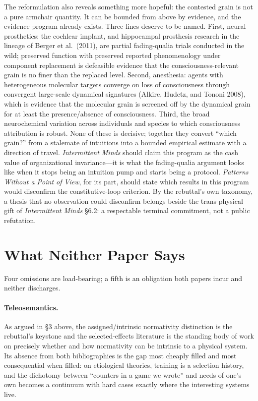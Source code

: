 \documentclass[11pt]{article}
\newcommand{\IM}{\emph{Intermittent Minds}}
\newcommand{\PP}{\emph{Patterns Without a Point of View}}
\begin{document}
The reformulation also reveals something more hopeful: the contested grain is not a pure armchair quantity. It can be bounded from above by evidence, and the evidence program already exists. Three lines deserve to be named. First, neural prosthetics: the cochlear implant, and hippocampal prosthesis research in the lineage of Berger et al.\ (2011), are partial fading-qualia trials conducted in the wild; preserved function with preserved reported phenomenology under component replacement is defeasible evidence that the consciousness-relevant grain is no finer than the replaced level. Second, anesthesia: agents with heterogeneous molecular targets converge on loss of consciousness through convergent large-scale dynamical signatures (Alkire, Hudetz, and Tononi 2008), which is evidence that the molecular grain is screened off by the dynamical grain for at least the presence/absence of consciousness. Third, the broad neurochemical variation across individuals and species to which consciousness attribution is robust. None of these is decisive; together they convert ``which grain?'' from a stalemate of intuitions into a bounded empirical estimate with a direction of travel. \IM{} should claim this program as the cash value of organizational invariance---it is what the fading-qualia argument looks like when it stops being an intuition pump and starts being a protocol. \PP{}, for its part, should state which results in this program would disconfirm the constitutive-loop criterion. By the rebuttal's own taxonomy, a thesis that no observation could disconfirm belongs beside the trans-physical gift of \IM{} \S 6.2: a respectable terminal commitment, not a public refutation.

\section{What Neither Paper Says}

Four omissions are load-bearing; a fifth is an obligation both papers incur and neither discharges.

\paragraph{Teleosemantics.} As argued in \S 3 above, the assigned/intrinsic normativity distinction is the rebuttal's keystone and the selected-effects literature is the standing body of work on precisely whether and how normativity can be intrinsic to a physical system. Its absence from both bibliographies is the gap most cheaply filled and most consequential when filled: on etiological theories, training is a selection history, and the dichotomy between ``counters in a game we wrote'' and needs of one's own becomes a continuum with hard cases exactly where the interesting systems live.
\end{document}
